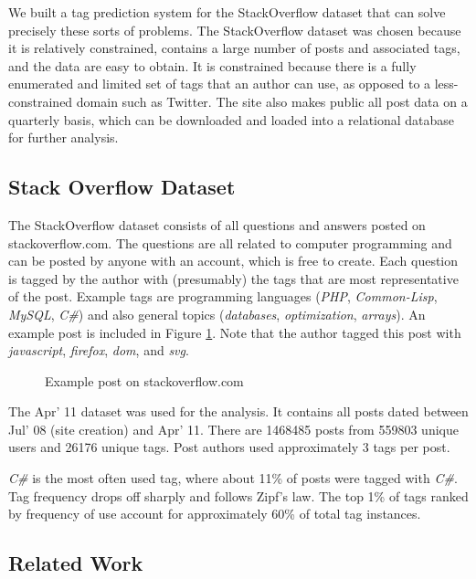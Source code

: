 \documentclass[10pt,letterpaper]{article}
\begin{document}
We built a tag prediction system for the StackOverflow dataset that can solve precisely these sorts of problems.
The StackOverflow dataset was chosen because it is relatively constrained, contains a large number of posts and associated tags, and the data are easy to obtain.
It is constrained because there is a fully enumerated and limited set of tags that an author can use, as opposed to a less-constrained domain such as Twitter.
The site also makes public all post data on a quarterly basis, which can be downloaded and loaded into a relational database for further analysis.

\subsection{Stack Overflow Dataset}

The StackOverflow dataset consists of all questions and answers posted on stackoverflow.com.
The questions are all related to computer programming and can be posted by anyone with an account, which is free to create.
Each question is tagged by the author with (presumably) the tags that are most representative of the post.
Example tags are programming languages (\emph{PHP}, \emph{Common-Lisp}, \emph{MySQL}, \emph{C\#}) and also general topics (\emph{databases}, \emph{optimization}, \emph{arrays}).
An example post is included in Figure \ref{fig:examplePost}.
Note that the author tagged this post with \emph{javascript}, \emph{firefox}, \emph{dom}, and \emph{svg}.

\begin{figure}[ht]
  \centering
  \caption{Example post on stackoverflow.com}
  \label{fig:examplePost}
\end{figure}

The Apr' 11 dataset \cite{DataDump2011} was used for the analysis.
It contains all posts dated between Jul' 08 (site creation) and Apr' 11.
There are \num{1468485} posts from \num{559803} unique users and \num{26176} unique tags.
Post authors used approximately 3 tags per post.

\emph{C\#} is the most often used tag, where about 11\% of posts were tagged with \emph{C\#}.
Tag frequency drops off sharply and follows Zipf's law.
The top 1\% of tags ranked by frequency of use account for approximately 60\% of total tag instances.

\subsection{Related Work}
\end{document}
